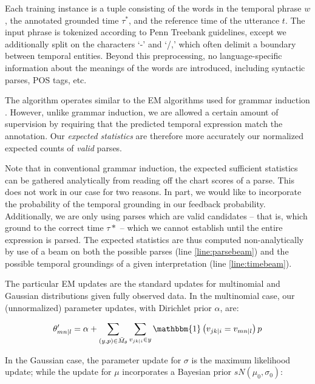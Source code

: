 Each training instance is a tuple consisting of the words in the temporal
	phrase $w$, the annotated grounded time $\tau^*$, and the reference time
	of the utterance $t$.
The input phrase is tokenized according to Penn Treebank guidelines,
	except we additionally split on the characters `-' and `/,' which
	often delimit a boundary between temporal entities.
Beyond this preprocessing, no language-specific information about the meanings
	of the words are introduced, including syntactic parses, POS tags, etc.

The algorithm operates similar to the EM algorithms used for grammar induction
	\cite{key:2004klein-induction,key:1992carroll-induction}.
However, unlike grammar induction, we are allowed a certain amount of
	supervision by requiring that the predicted temporal expression
	match the annotation.
Our \textit{expected statistics} are therefore more accurately our normalized
	expected counts of \textit{valid} parses.

Note that in conventional grammar induction, the expected sufficient statistics
	can be gathered analytically from reading off the chart scores of a parse.
This does not work in our case for two reasons.
In part, we would like to incorporate the probability of the temporal
	grounding in our feedback probability.
Additionally, we are only using parses which are valid candidates -- that is,
	which ground to the correct time $\tau*$ -- which we cannot establish
	until the entire expression is parsed.
The expected statistics are thus computed non-analytically by use of
	a beam on both the possible parses (line \ref{line:parsebeam}) and the
	possible temporal groundings of a given interpretation (line
	\ref{line:timebeam}).

The particular EM updates are the standard
	updates for multinomial and Gaussian distributions given fully observed data.
In the multinomial case, our (unnormalized) parameter updates, with
	Dirichlet prior $\alpha$, are:

\begin{equation}
	\theta_{mn \mid l}' =
		\alpha + 
		\sum\limits_{(y,p) \in \bar M_\theta} \sum\limits_{v_{jk \mid i} \in y}
			\mathbbm{1}\left(v_{jk \mid i} = v_{mn \mid l}\right) p
\label{eqn:multinomialEM}
\end{equation}

In the Gaussian case, the parameter update for $\sigma$ is the maximum
	likelihood update; while the update for $\mu$ incorporates a
	Bayesian prior $sN(\mu_0,\sigma_0)$:

